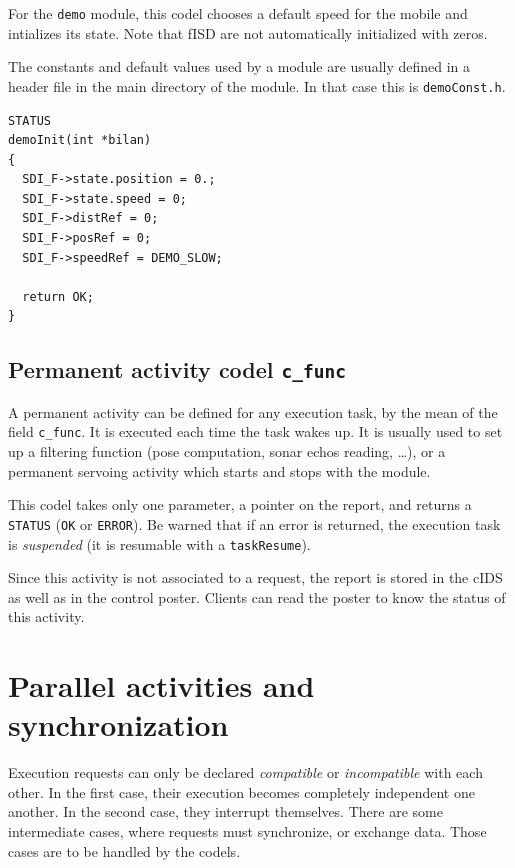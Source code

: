 For the {\tt demo} module,  this codel chooses  a  default speed for  the
mobile  and intializes its state.   Note  that fISD are not automatically
initialized with zeros.

The constants and default values used by a  module are usually defined in
a header file in the main directory  of the module. In  that case this is
{\tt demoConst.h}.

\begin{center}\begin{cartouche}\small\begin{verbatim}
STATUS
demoInit(int *bilan)
{
  SDI_F->state.position = 0.;
  SDI_F->state.speed = 0;
  SDI_F->distRef = 0;
  SDI_F->posRef = 0;
  SDI_F->speedRef = DEMO_SLOW;

  return OK;
}
\end{verbatim}\end{cartouche}\end{center}


\subsection{Permanent activity codel {\tt c\_func}}

A permanent activity can  be defined for  any execution task, by the mean
of the  field  {\tt c\_func}.  It is executed  each  time the task  wakes
up. It is usually used to set up a  filtering function (pose computation,
sonar echos  reading, \ldots), or   a permanent  servoing activity  which
starts and stops with the module.

This codel takes only one parameter, a pointer on the report, and returns
a {\tt STATUS} ({\tt OK} or {\tt ERROR}).  Be warned that  if an error is
returned, the execution task  is {\em suspended} (it  is resumable with a
{\tt taskResume}).

Since this activity is not associated to a  request, the report is stored
in the cIDS as well as in the control poster. Clients can read the poster
to know the status of this activity.


\section{Parallel activities and synchronization}

Execution   requests can  only  be  declared  {\em   compatible} or  {\em
incompatible} with each other. In the first case, their execution becomes
completely  independent one another.  In  the second case, they interrupt
themselves.  There are  some   intermediate  cases, where  requests  must
synchronize, or exchange  data.   Those cases are  to  be handled  by the
codels.

